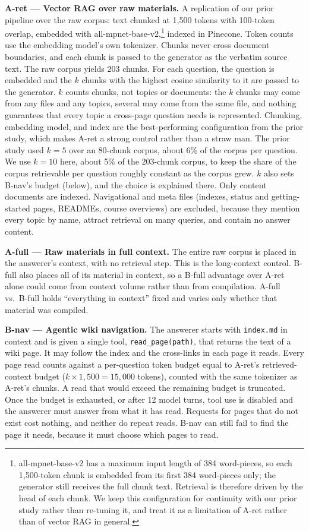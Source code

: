 \documentclass[letterpaper]{article} %
\begin{document}
\textbf{A-ret --- Vector RAG over raw materials.} A replication of our prior pipeline over the raw corpus: text chunked at 1{,}500 tokens with 100-token overlap, embedded with all-mpnet-base-v2,\footnote{all-mpnet-base-v2 has a maximum input length of 384 word-pieces, so each 1{,}500-token chunk is embedded from its first 384 word-pieces only; the generator still receives the full chunk text. Retrieval is therefore driven by the head of each chunk. We keep this configuration for continuity with our prior study rather than re-tuning it, and treat it as a limitation of A-ret rather than of vector RAG in general.} indexed in Pinecone. Token counts use the embedding model's own tokenizer. Chunks never cross document boundaries, and each chunk is passed to the generator as the verbatim source text. The raw corpus yields 203 chunks. For each question, the question is embedded and the $k$ chunks with the highest cosine similarity to it are passed to the generator. $k$ counts chunks, not topics or documents: the $k$ chunks may come from any files and any topics, several may come from the same file, and nothing guarantees that every topic a cross-page question needs is represented. Chunking, embedding model, and index are the best-performing configuration from the prior study, which makes A-ret a strong control rather than a straw man. The prior study used $k{=}5$ over an 80-chunk corpus, about 6\% of the corpus per question. We use $k{=}10$ here, about 5\% of the 203-chunk corpus, to keep the share of the corpus retrievable per question roughly constant as the corpus grew. $k$ also sets B-nav's budget (below), and the choice is explained there. Only content documents are indexed. Navigational and meta files (indexes, status and getting-started pages, READMEs, course overviews) are excluded, because they mention every topic by name, attract retrieval on many queries, and contain no answer content.

\textbf{A-full --- Raw materials in full context.} The entire raw corpus is placed in the answerer's context, with no retrieval step. This is the long-context control. B-full also places all of its material in context, so a B-full advantage over A-ret alone could come from context volume rather than from compilation. A-full vs.\ B-full holds ``everything in context'' fixed and varies only whether that material was compiled.

\textbf{B-nav --- Agentic wiki navigation.} The answerer starts with \texttt{index.md} in context and is given a single tool, \texttt{read\_page(path)}, that returns the text of a wiki page. It may follow the index and the cross-links in each page it reads. Every page read counts against a per-question token budget equal to A-ret's retrieved-context budget ($k \times 1{,}500 = 15{,}000$ tokens), counted with the same tokenizer as A-ret's chunks. A read that would exceed the remaining budget is truncated. Once the budget is exhausted, or after 12 model turns, tool use is disabled and the answerer must answer from what it has read. Requests for pages that do not exist cost nothing, and neither do repeat reads. B-nav can still fail to find the page it needs, because it must choose which pages to read.
\end{document}
